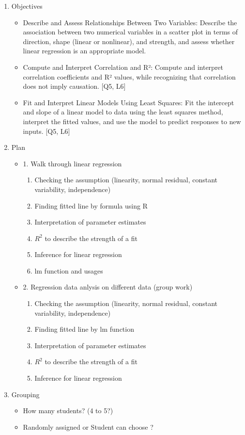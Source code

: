 \documentclass[12pt]{article}
\begin{document}
\begin{enumerate}
    \item Objectives
    \begin{itemize}
        \item Describe and Assess Relationships Between Two Variables: Describe the association between two numerical variables in a scatter plot in terms of direction, shape (linear or nonlinear), and strength, and assess whether linear regression is an appropriate model. 
        \item Compute and Interpret Correlation and R²: Compute and interpret correlation coefficients and R² values, while recognizing that correlation does not imply causation. [Q5, L6] 
        \item Fit and Interpret Linear Models Using Least Squares: Fit the intercept and slope of a linear model to data using the least squares method, interpret the fitted values, and use the model to predict responses to new inputs. [Q5, L6] 
    \end{itemize}
    \item Plan
    \begin{itemize}
        \item 1. Walk through linear regression 
        \begin{enumerate}
            \item Checking the assumption (linearity, normal residual, constant variability, independence)
            \item Finding fitted line by formula using R
            \item Interpretation of parameter estimates
            \item $R^2$ to describe the strength of a fit
            \item Inference for linear regression
            \item lm function and usages
        \end{enumerate}
        \item 2. Regression data anlysis on different data (group work)
        \begin{enumerate}
            \item Checking the assumption (linearity, normal residual, constant variability, independence)
            \item Finding fitted line by lm function 
            \item Interpretation of parameter estimates
            \item $R^2$ to describe the strength of a fit
            \item Inference for linear regression
        \end{enumerate} 
    \end{itemize}

    \item  Grouping 
    \begin{itemize}
        \item How many students? (4 to 5?)
        \item Randomly assigned or Student can choose ? 
    \end{itemize}
    


\end{enumerate}
    
\end{document}
